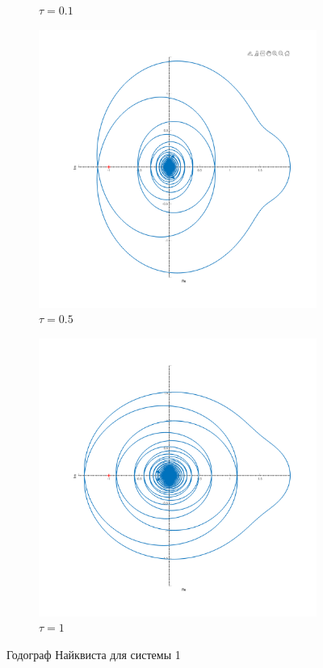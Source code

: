 \begin{figure}[ht!]
\begin{subfigure}[b]{0.5\textwidth}
         \caption{$\tau = 0.1$}
    \end{subfigure}
    \begin{subfigure}[b]{0.5\textwidth}
         \centering
         \includegraphics[width=\textwidth]{media/plots/task6_nyquist_open_3.png}
         \caption{$\tau = 0.5$}
    \end{subfigure}
    \begin{subfigure}[b]{0.5\textwidth}
         \centering
         \includegraphics[width=\textwidth]{media/plots/task6_nyquist_open_4.png}
         \caption{$\tau = 1$}
    \end{subfigure}
    \caption{Годограф Найквиста для системы 1}
    \label{fig:task6_niquist}
\end{figure}
